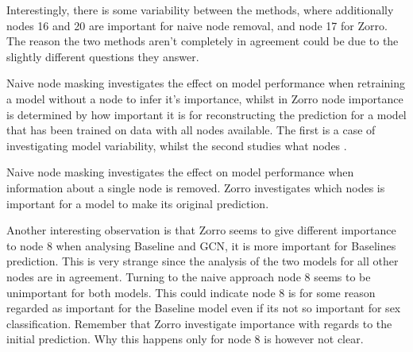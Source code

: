 Interestingly, there is some variability between the methods, where additionally nodes 16 and 20 are important for naive node removal, and node 17 for Zorro. The reason the two methods aren't completely in agreement could be due to the slightly different questions they answer. 

Naive node masking investigates the effect on model performance when retraining a model without a node to infer it's importance, whilst in Zorro node importance is determined by how important it is for reconstructing the prediction for a model that has been trained on data with all nodes available. The first is a case of investigating model variability, whilst the second studies what nodes . 

Naive node masking investigates the effect on model performance when information about a single node is removed. Zorro investigates which nodes is important for a model to make its original prediction. 

Another interesting observation is that Zorro seems to give different importance to node 8 when analysing Baseline and GCN, it is more important for Baselines prediction. This is very strange since the analysis of the two models for all other nodes are in agreement. Turning to the naive approach node 8 seems to be unimportant for both models. This could indicate node 8 is for some reason regarded as important for the Baseline model even if its not so important for sex classification. Remember that Zorro investigate importance with regards to the initial prediction. Why this happens only for node 8 is however not clear. 






